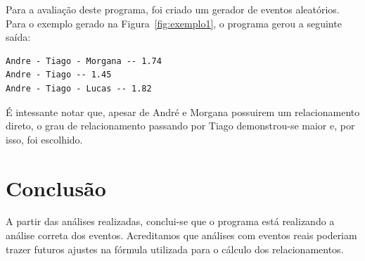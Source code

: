 \documentclass[a4paper, twocolumn, 12pt]{article}
\begin{document}
Para a avaliação deste programa, foi criado um gerador de eventos aleatórios. Para o exemplo gerado na Figura~\ref{fig:exemplo1}, o programa gerou a seguinte saída:

\begin{verbatim}
Andre - Tiago - Morgana -- 1.74
Andre - Tiago -- 1.45
Andre - Tiago - Lucas -- 1.82
\end{verbatim}

É intessante notar que, apesar de André e Morgana possuirem um relacionamento direto, o grau de relacionamento passando por Tiago demonstrou-se maior e, por isso, foi escolhido.


\section{Conclusão}

A partir das análises realizadas, conclui-se que o programa está realizando a análise correta dos eventos. Acreditamos que análises com eventos reais poderiam trazer futuros ajustes na fórmula utilizada para o cálculo dos relacionamentos.




\begin{small}
  
\end{small}
\end{document}
